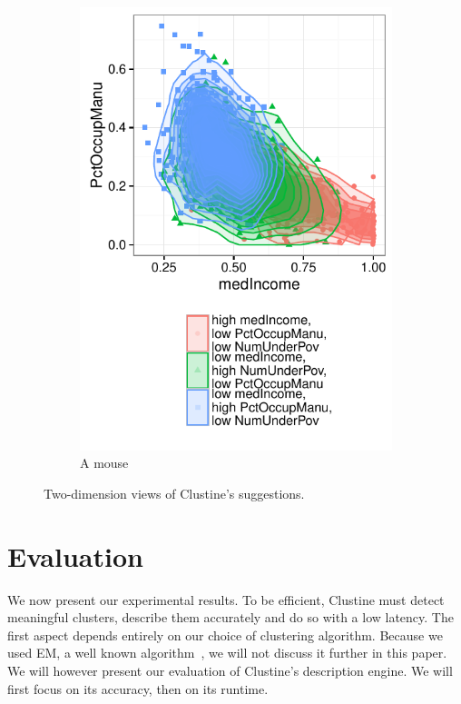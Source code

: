 \begin{figure}
\begin{subfigure}[b]{0.3\textwidth}
        \includegraphics[width=\textwidth]{Experiments/Case2Validation8}
        \caption{A mouse}
        \label{fig:validation3}
    \end{subfigure}
    \caption{Two-dimension views of Clustine's suggestions.}\label{fig:propvis}
\end{figure}


\section{Evaluation}
\label{sec:eval}
We now present our experimental results. To be efficient, Clustine must detect
meaningful clusters, describe them accurately and do so with a low latency.
The first aspect depends entirely on our choice of clustering algorithm.
Because we used EM, a well known algorithm~\cite{dempster1977maximum}, we will
not discuss it further in this paper. We will however present our evaluation of
Clustine's description engine. We will first focus on its accuracy, then on its
runtime.

